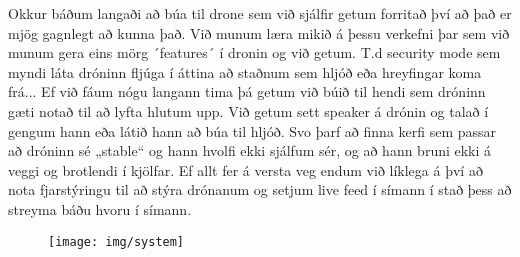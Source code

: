 Okkur báðum langaði að búa til drone sem við sjálfir getum forritað því að það er mjög gagnlegt að kunna það. Við munum læra mikið á þessu verkefni þar sem við munum gera eins mörg ´features´ í dronin og við getum. T.d security mode sem myndi láta dróninn fljúga í áttina að staðnum sem hljóð eða hreyfingar koma frá... Ef við fáum nógu langann tima þá getum við búið til hendi sem dróninn gæti notað til að lyfta hlutum upp. Við getum sett speaker á drónin og talað í gengum hann eða látið hann að búa til hljóð. Svo þarf að finna kerfi sem passar að dróninn sé „stable“ og hann hvolfi ekki sjálfum sér, og að hann bruni ekki á veggi og brotlendi í kjölfar. 
Ef allt fer á versta veg endum við líklega á því að nota fjarstýringu til að stýra drónanum og setjum live feed í símann í stað þess að streyma báðu hvoru í símann.

\begin{figure}[h]
\texttt{[image: img/system]}
\end{figure}
